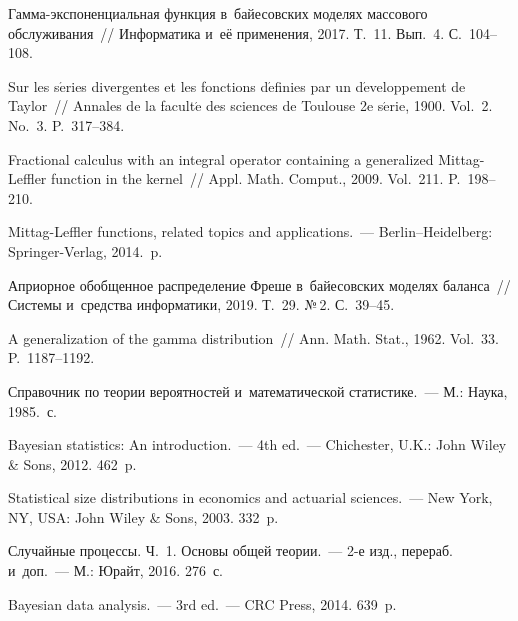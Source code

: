 \begin{multicols}{2}
{{\begin{thebibliography}{99}
Гам\-ма-экс\-по\-нен\-ци\-аль\-ная функция в~байесовских моделях массового обслуживания~// 
Информатика и~её применения, 2017. Т.~11. Вып.~4. С.~104--108.

Sur les s$\acute{\mbox{e}}$ries divergentes et les fonctions 
d$\acute{\mbox{e}}$finies par un d$\acute{\mbox{e}}$veloppement de Taylor~// 
Annales de la facult$\acute{\mbox{e}}$ des sciences de Toulouse
 2e s$\acute{\mbox{e}}$rie, 1900. Vol.~2. No.~3. P.~317--384.

Fractional calculus with an integral operator containing a generalized 
Mittag-Leffler function in the kernel~// Appl. Math. Comput., 2009. Vol.~211. P.~198--210.

Mittag-Leffler functions, related topics and applications.~--- Berlin--Heidelberg: Springer-Verlag, 2014.~p.

Априорное обобщенное распределение Фреше в~байесовских моделях баланса~// Системы 
и~средства информатики, 2019. Т.~29. №\,2. С.~39--45.

A generalization of the gamma distribution~// 
Ann. Math. Stat., 1962. Vol.~33. P.~1187--1192.

Справочник по теории вероятностей и~математической статистике.~--- 
М.: Наука, 1985.~с.

Bayesian statistics: An introduction.~--- 4th ed.~--- 
Chichester, U.K.: John Wiley \& Sons, 2012. 462~p.

Statistical size distributions in economics and actuarial sciences.~--- New
York, NY, USA: John Wiley \& Sons, 2003. 332~p.

Случайные процессы. Ч.~1. Основы общей теории.~--- 2-е изд., перераб. и~доп.~--- М.: Юрайт, 2016. 276~с.

 Bayesian data analysis.~--- 3rd ed.~--- CRC Press, 2014. 639~p.


\end{thebibliography}}}
\end{multicols}
